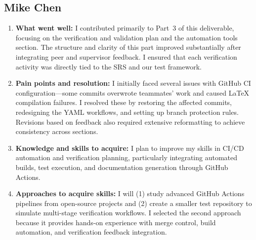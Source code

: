 \documentclass[12pt, titlepage]{article}
\begin{document}
\subsection*{Mike Chen}
\begin{enumerate}
  \item \textbf{What went well:}  
  I contributed primarily to Part~3 of this deliverable, focusing on the verification and validation plan
  and the automation tools section. The structure and clarity of this part improved substantially after
  integrating peer and supervisor feedback. I ensured that each verification activity was directly tied
  to the SRS and our test framework.

  \item \textbf{Pain points and resolution:}  
  I initially faced several issues with GitHub CI configuration—some commits overwrote teammates’
  work and caused LaTeX compilation failures. I resolved these by restoring the affected commits,
  redesigning the YAML workflows, and setting up branch protection rules. Revisions based on
  feedback also required extensive reformatting to achieve consistency across sections.

  \item \textbf{Knowledge and skills to acquire:}  
  I plan to improve my skills in CI/CD automation and verification planning, particularly integrating
  automated builds, test execution, and documentation generation through GitHub Actions.

  \item \textbf{Approaches to acquire skills:}  
  I will (1) study advanced GitHub Actions pipelines from open-source projects and (2) create a
  smaller test repository to simulate multi-stage verification workflows. I selected the second
  approach because it provides hands-on experience with merge control, build automation, and
  verification feedback integration.
\end{enumerate}
\end{document}
